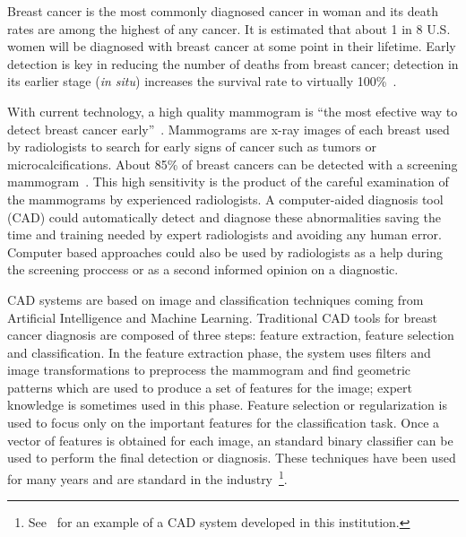 Breast cancer is the most commonly diagnosed cancer in woman and its death rates are among the highest of any cancer. It is estimated that about 1 in 8 U.S. women will be diagnosed with breast cancer at some point in their lifetime. Early detection is key in reducing the number of deaths from breast cancer; detection in its earlier stage (\textit{in situ}) increases the survival rate to virtually 100\%~\cite{Howlader2014}.

With current technology, a high quality mammogram is ``the most efective way to detect breast cancer early''~\cite{Mammograms2014}. Mammograms are x-ray images of each breast used by radiologists to search for early signs of cancer such as tumors or microcalcifications. About 85\% of breast cancers can be detected with a screening mammogram~\cite{PerformanceMammography2013}. This high sensitivity is the product of the careful examination of the mammograms by experienced radiologists. A computer-aided diagnosis tool (CAD) could automatically detect and diagnose these abnormalities saving the time and training needed by expert radiologists and avoiding any human error. Computer based approaches could also be used by radiologists as a help during the screening proccess or as a second informed opinion on a diagnostic.

CAD systems are based on image and classification techniques coming from Artificial Intelligence and Machine Learning. Traditional CAD tools for breast cancer diagnosis are composed of three steps: feature extraction, feature selection and classification. In the feature extraction phase, the system uses filters and image transformations to preprocess the mammogram and find geometric patterns which are used to produce a set of features for the image; expert knowledge is sometimes used in this phase. Feature selection or regularization is used to focus only on the important features for the classification task. Once a vector of features is obtained for each image, an standard binary classifier can be used to perform the final detection or diagnosis. These techniques have been used for many years and are standard in the industry~\footnote{See~\cite{Hernandez2014} for an example of a CAD system developed in this institution.}.

